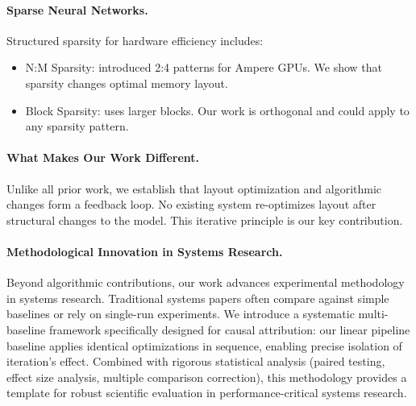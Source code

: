 \documentclass{article}
\begin{document}
\paragraph{Sparse Neural Networks.}
Structured sparsity for hardware efficiency includes:
\begin{itemize}
    \item N:M Sparsity: \cite{mishra2021accelerating} introduced 2:4 patterns for Ampere GPUs. We show that sparsity changes optimal memory layout.
    \item Block Sparsity: \cite{gray2017gpu} uses larger blocks. Our work is orthogonal and could apply to any sparsity pattern.
\end{itemize}

\paragraph{What Makes Our Work Different.}
Unlike all prior work, we establish that layout optimization and algorithmic changes form a feedback loop. No existing system re-optimizes layout after structural changes to the model. This iterative principle is our key contribution.

\paragraph{Methodological Innovation in Systems Research.}
Beyond algorithmic contributions, our work advances experimental methodology in systems research. Traditional systems papers often compare against simple baselines or rely on single-run experiments. We introduce a systematic multi-baseline framework specifically designed for causal attribution: our linear pipeline baseline applies identical optimizations in sequence, enabling precise isolation of iteration's effect. Combined with rigorous statistical analysis (paired testing, effect size analysis, multiple comparison correction), this methodology provides a template for robust scientific evaluation in performance-critical systems research.
\end{document}
